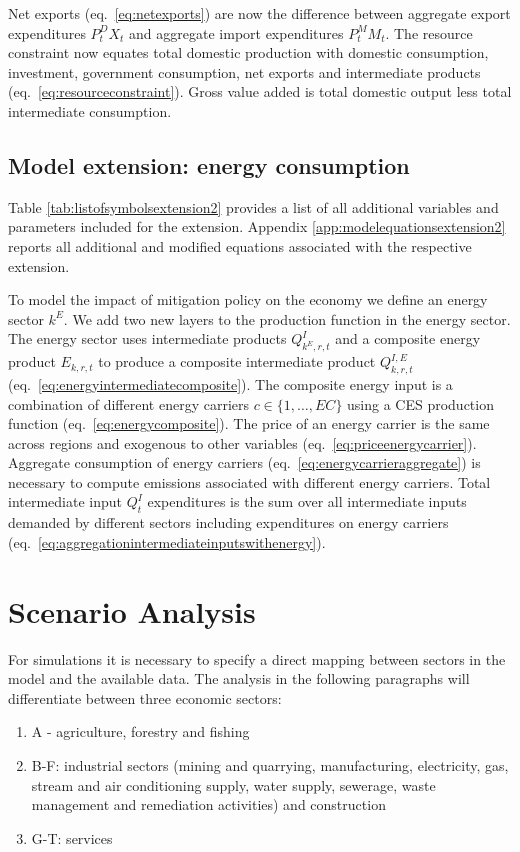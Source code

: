 \documentclass[10pt,a4paper]{article}
\begin{document}
Net exports (eq.~\eqref{eq:netexports}) are now the difference between aggregate export expenditures $P^{D}_{t} X_{t}$ and aggregate import expenditures $P^{M}_{t} M_{t}$. The resource constraint now equates total domestic production with domestic consumption, investment, government consumption, net exports and intermediate products (eq.~\eqref{eq:resourceconstraint}). Gross value added is total domestic output less total intermediate consumption.

\subsection{Model extension: energy consumption} 
Table \ref{tab:listofsymbolsextension2} provides a list of all additional variables and parameters included for the extension. Appendix \ref{app:modelequationsextension2} reports all additional and modified equations associated with the respective extension.

To model the impact of mitigation policy on the economy we define an energy sector $k^{E}$. We add two new layers to the production function in the energy sector. The energy sector uses intermediate products $Q^{I}_{k^{E},r,t}$ and a composite energy product $E_{k,r,t}$ to produce a composite intermediate product $Q^{I,E}_{k,r,t}$ (eq.~\eqref{eq:energyintermediatecomposite}). The composite energy input is a combination of different energy carriers $c \in \{1, \dots, EC\}$ using a CES production function (eq.~\eqref{eq:energycomposite}). The price of an energy carrier is the same across regions and exogenous to other variables (eq.~\eqref{eq:priceenergycarrier}). Aggregate consumption of energy carriers (eq.~\eqref{eq:energycarrieraggregate}) is necessary to compute emissions associated with different energy carriers. Total  intermediate input $Q^{I}_{t}$ expenditures is the sum over all intermediate inputs demanded by different sectors including expenditures on energy carriers (eq.~\eqref{eq:aggregationintermediateinputswithenergy}).

\section{Scenario Analysis}

For simulations it is necessary to specify a direct mapping between sectors in the model and the available data. The analysis in the following paragraphs will differentiate between three economic sectors: 
\begin{enumerate}
	\item A - agriculture, forestry and fishing
	\item B-F: industrial sectors (mining and quarrying, manufacturing, electricity, gas, stream and air conditioning supply, water supply, sewerage, waste management and remediation activities) and construction
	\item G-T: services
\end{enumerate}
\end{document}
